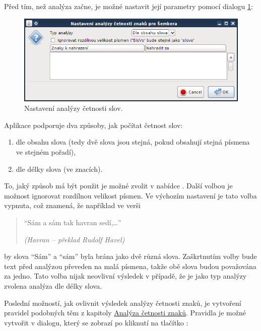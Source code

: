 \documentclass[dp.tex]{subfiles}
\begin{document}
Před tím, než analýza začne, je možné nastavit její parametry pomocí dialogu \ref{fig:gui-word-analysis-dialog}:
\begin{figure}[H]
\centering
\includegraphics[max width=\textwidth,keepaspectratio=true]{imgs-60-aplikace/gui-word-analysis-dialog}
\caption{Nastavení analýzy četnosti slov.}
\label{fig:gui-word-analysis-dialog}
\end{figure}

Aplikace podporuje dva způsoby, jak počítat četnost slov:

\begin{enumerate}
\item dle obsahu slova (tedy dvě slova jsou stejná, pokud obsahují stejná písmena ve stejném pořadí),
\item dle délky slova (ve znacích).
\end{enumerate}

To, jaký způsob má být použit je možné zvolit v nabídce . Další volbou je možnost ignorovat rozdílnou velikost písmen. Ve výchozím nastavení je tato volba vypnuta, což znamená, že například ve verši

\begin{verse}
\enquote{Sám a sám tak havran sedí,\ldots}
\begin{flushright}
\textit{(Havran -- překlad Rudolf Havel)}
\end{flushright}
\end{verse}

by slova \enquote{Sám} a \enquote{sám} byla brána jako dvě různá slova. Zaškrtnutím volby  bude text před analýzou převeden na malá písmena, takže obě slova budou považována za jedno. Tato volba nijak neovlivní výsledek v případě, že je jako typ analýzy zvolena analýza dle délky slova.

Poslední možností, jak ovlivnit výsledek analýzy četnosti znaků, je vytvoření pravidel podobných těm z kapitoly \hyperref[chap:analyza-cetnosti-znaku]{Analýza četnosti znaků}. Pravidla je možné vytvořit v dialogu, který se zobrazí po kliknutí na tlačítko :
\end{document}
